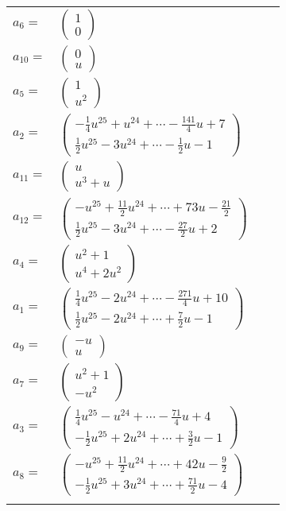 \documentclass[1p]{elsarticle_modified}
\theoremstyle{definition}
\begin{document}
\begin{tabular}{m{7pt} m{180pt} m{7pt} m{180pt} }
\flushright $a_{6}=$&$\begin{pmatrix}1\\0\end{pmatrix}$ \\
\flushright $a_{10}=$&$\begin{pmatrix}0\\u\end{pmatrix}$ \\
\flushright $a_{5}=$&$\begin{pmatrix}1\\u^2\end{pmatrix}$ \\
\flushright $a_{2}=$&$\begin{pmatrix}-\frac{1}{4} u^{25}+u^{24}+\cdots-\frac{141}{4} u+7\\\frac{1}{2} u^{25}-3 u^{24}+\cdots-\frac{1}{2} u-1\end{pmatrix}$ \\
\flushright $a_{11}=$&$\begin{pmatrix}u\\u^3+u\end{pmatrix}$ \\
\flushright $a_{12}=$&$\begin{pmatrix}- u^{25}+\frac{11}{2} u^{24}+\cdots+73 u-\frac{21}{2}\\\frac{1}{2} u^{25}-3 u^{24}+\cdots-\frac{27}{2} u+2\end{pmatrix}$ \\
\flushright $a_{4}=$&$\begin{pmatrix}u^2+1\\u^4+2 u^2\end{pmatrix}$ \\
\flushright $a_{1}=$&$\begin{pmatrix}\frac{1}{4} u^{25}-2 u^{24}+\cdots-\frac{271}{4} u+10\\\frac{1}{2} u^{25}-2 u^{24}+\cdots+\frac{7}{2} u-1\end{pmatrix}$ \\
\flushright $a_{9}=$&$\begin{pmatrix}- u\\u\end{pmatrix}$ \\
\flushright $a_{7}=$&$\begin{pmatrix}u^2+1\\- u^2\end{pmatrix}$ \\
\flushright $a_{3}=$&$\begin{pmatrix}\frac{1}{4} u^{25}- u^{24}+\cdots-\frac{71}{4} u+4\\-\frac{1}{2} u^{25}+2 u^{24}+\cdots+\frac{3}{2} u-1\end{pmatrix}$ \\
\flushright $a_{8}=$&$\begin{pmatrix}- u^{25}+\frac{11}{2} u^{24}+\cdots+42 u-\frac{9}{2}\\-\frac{1}{2} u^{25}+3 u^{24}+\cdots+\frac{71}{2} u-4\end{pmatrix}$\\&\end{tabular}
\end{document}
